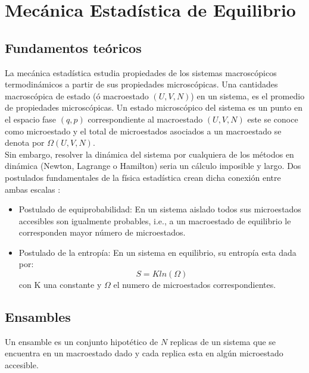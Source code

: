 \chapter{Mecánica Estadística de Equilibrio}
\section{Fundamentos teóricos}
La mecánica estadística estudia propiedades de los sistemas macroscópicos termodinámicos a partir de sus propiedades microscópicas. Una cantidades macroscópica de estado (ó macroestado $(U,V,N)$) en un sistema, es el promedio de propiedades microscópicas. Un estado microscópico del sistema es un punto en el espacio fase $(q,p)$ correspondiente al macroestado $(U,V,N)$ este se conoce como microestado y el total de microestados asociados a un macroestado se denota por $\Omega(U,V,N)$.\\

Sin embargo, resolver la dinámica del sistema por cualquiera de los métodos en dinámica (Newton, Lagrange o Hamilton) seria un cálculo imposible y largo. Dos postulados fundamentales de la física estadística crean dicha conexión entre ambas escalas \cite{tuckerman2010}: \\

\begin{itemize}
    \item Postulado de equiprobabilidad: En un sistema aislado todos sus microestados accesibles son igualmente probables, i.e., a un macroestado de equilibrio le corresponden mayor número de microestados.\\
    
    \item Postulado de la entropía: En un sistema en equilibrio, su entropía esta dada por:
    \begin{equation}
        S=Kln(\Omega)
    \end{equation}
    con K una constante y $\Omega$ el numero de microestados correspondientes.
\end{itemize}


\section{Ensambles}

Un ensamble es un conjunto hipotético de $N$ replicas de un sistema que se encuentra en un macroestado dado y cada replica esta en algún microestado accesible.\\

